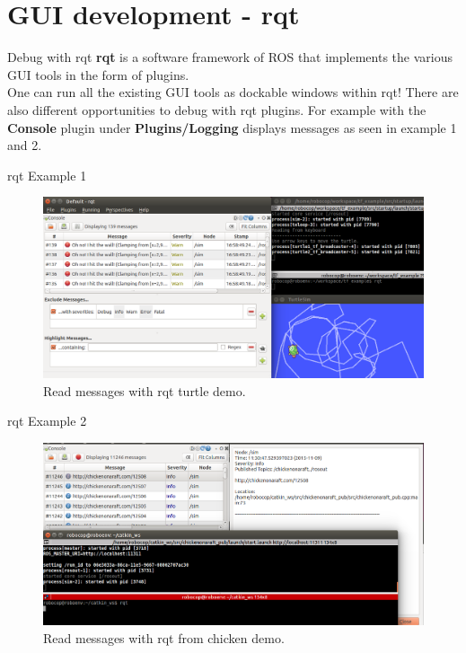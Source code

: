 \documentclass{beamer}
\begin{document}
\section{GUI development - rqt}
\begin{frame}{Debug with rqt}
	\textbf{rqt} is a software framework of ROS that implements the various GUI tools in the form of plugins. \\ One can run all the existing GUI tools as dockable windows within rqt!
	\newline
	\newline
	There are also different opportunities to debug with rqt plugins. For example with the \textbf{Console} plugin under \textbf{Plugins/Logging} displays messages as seen in example 1 and 2.
\end{frame}
\begin{frame}{rqt Example 1}
\begin{figure}[p]
	\centering
	\includegraphics[width=1\textwidth]{rqt.png}
	\caption{Read messages with rqt turtle demo.}
	\label{fig::rqt}
\end{figure}
\end{frame}
\begin{frame}{rqt Example 2}
	\begin{figure}[p]
		\centering
		\includegraphics[width=1\textwidth]{chickenrqt.png}
		\caption{Read messages with rqt from chicken demo.}
		\label{fig::rqt}
	\end{figure}
\end{frame}
\end{document}
